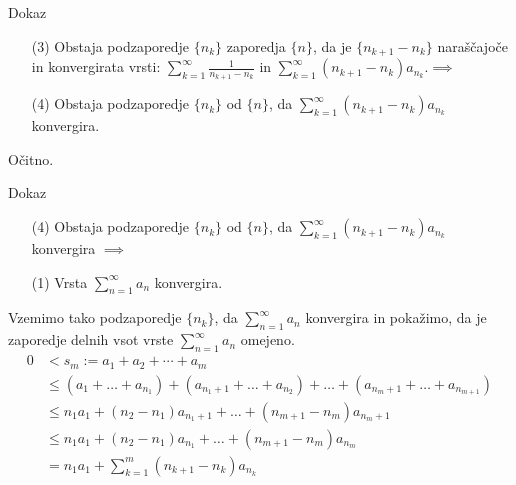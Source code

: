 \documentclass{beamer}
\begin{document}
\begin{frame}{Dokaz}
    \begin{block}{}
        \begin{enumerate} 
            \item[(3)] Obstaja podzaporedje $\{n_k\}$ zaporedja $\{n\}$, da je $\{n_{k+1} - n_k\}$ 
            naraščajoče in konvergirata vrsti:
            $\sum_{k = 1}^{\infty}{\frac{1}{n_{k+1} - n_k}}$ in 
            $\sum_{k = 1}^{\infty}{(n_{k+1} - n_k)a_{n_k}}$.$ \implies$
            \item[(4)] Obstaja podzaporedje $\{n_k\}$ od $\{n\}$, da 
            $\sum_{k = 1}^{\infty}{(n_{k+1} - n_k)a_{n_k}}$ konvergira.

        \end{enumerate}
    \end{block} 
    
    \vspace{0.3cm}
    \pause
    
    Očitno.\\
    
\end{frame}


\begin{frame}{Dokaz}
    \begin{block}{}
        \begin{enumerate}  
            \item[(4)] Obstaja podzaporedje $\{n_k\}$ od $\{n\}$, da 
            $\sum_{k = 1}^{\infty}{(n_{k+1} - n_k)a_{n_k}}$ konvergira $\implies$
            \item[(1)] Vrsta $\sum_{n = 1}^{\infty}{a_n}$ konvergira.
        \end{enumerate}
    \end{block} 
    \pause
    
    Vzemimo tako podzaporedje  $\{n_k\}$, da $\sum_{n = 1}^{\infty}{a_n}$ konvergira in pokažimo, da je zaporedje delnih vsot
    vrste $\sum_{n = 1}^{\infty}{a_n}$ omejeno.
    \pause
    \[
    \begin{split}
        0 & < s_m := a_1 + a_2 + \cdots + a_m \\
        & \leq (a_1 + \ldots + a_{n_1}) + (a_{n_{1} + 1} + \ldots + a_{n_{2}})
        + \ldots  + (a_{n_{m} + 1} + \ldots + a_{n_{m+1}})\\
        & \leq n_{1}a_{1} + (n_2 - n_1)a_{n_{1} + 1} + \ldots + (n_{m+1} - n_m)a_{n_{m}+1}\\
        & \leq n_{1}a_{1} + (n_2 - n_1)a_{n_1} + \ldots + (n_{m+1} - n_{m})a_{n_{m}}\\
        & = n_{1}a_{1} + \sum_{k = 1}^{m}{(n_{k+1} - n_k)a_{n_k}}
    \end{split}
    \]

\end{frame}
\end{document}
